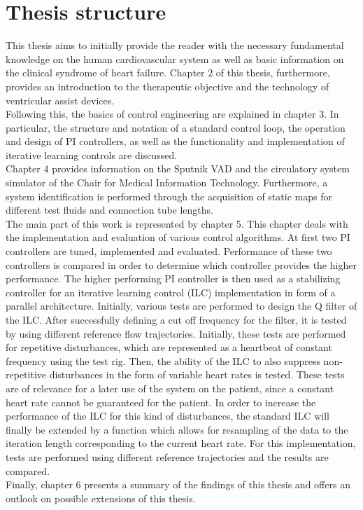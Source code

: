 \section{Thesis structure}
This thesis aims to initially provide the reader with the necessary fundamental knowledge on the human cardiovascular system as well as basic information on the clinical syndrome of heart failure. Chapter 2 of this thesis, furthermore, provides an introduction to the therapeutic objective and the technology of ventricular assist devices.
\\Following this, the basics of control engineering are explained in chapter 3. In particular, the structure and notation of a standard control loop, the operation and design of PI controllers, as well as the functionality and implementation of iterative learning controls are discussed.
\\Chapter 4 provides information on the Sputnik VAD and the circulatory system simulator of the Chair for Medical Information Technology. Furthermore, a system identification is performed through the acquisition of static maps for different test fluids and connection tube lengths.
\\The main part of this work is represented by chapter 5. This chapter deals with the implementation and evaluation of various control algorithms. At first two PI controllers are tuned, implemented and evaluated. Performance of these two controllers is compared in order to determine which controller provides the higher performance. The higher performing PI controller is then used as a stabilizing controller for an iterative learning control (ILC) implementation in form of a parallel architecture. Initially, various tests are performed to design the Q filter of the ILC. After successfully defining a cut off frequency for the filter, it is tested by using different reference flow trajectories. Initially, these tests are performed for repetitive disturbances, which are represented as a heartbeat of constant frequency using the test rig. Then, the ability of the ILC to also suppress non-repetitive disturbances in the form of variable heart rates is tested. These tests are of relevance for a later use of the system on the patient, since a constant heart rate cannot be guaranteed for the patient. In order to increase the performance of the ILC for this kind of disturbances, the standard ILC will finally be extended by a function which allows for resampling of the data to the iteration length corresponding to the current heart rate. For this implementation, tests are performed using different reference trajectories and the results are compared.
\\Finally, chapter 6 presents a summary of the findings of this thesis and offers an outlook on possible extensions of this thesis.
